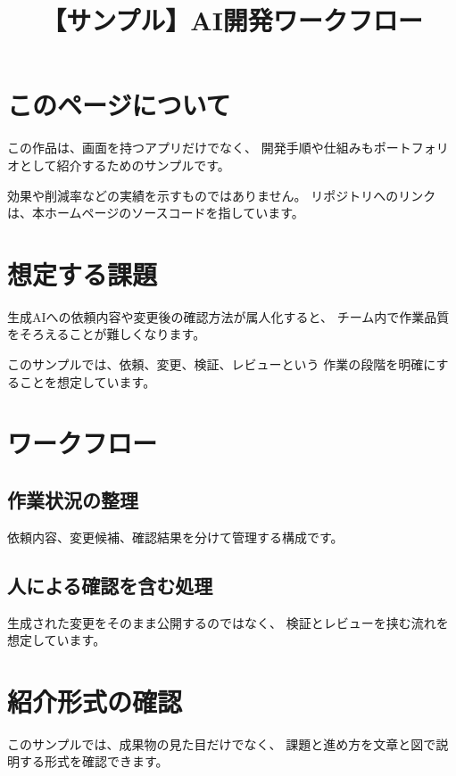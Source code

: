 \title{【サンプル】AI開発ワークフロー}


\begin{portfolio}

\section{このページについて}

この作品は、画面を持つアプリだけでなく、
開発手順や仕組みもポートフォリオとして紹介するためのサンプルです。

効果や削減率などの実績を示すものではありません。
リポジトリへのリンクは、本ホームページのソースコードを指しています。

\section{想定する課題}

生成AIへの依頼内容や変更後の確認方法が属人化すると、
チーム内で作業品質をそろえることが難しくなります。

このサンプルでは、依頼、変更、検証、レビューという
作業の段階を明確にすることを想定しています。

\section{ワークフロー}

\subsection{作業状況の整理}

依頼内容、変更候補、確認結果を分けて管理する構成です。


\subsection{人による確認を含む処理}

生成された変更をそのまま公開するのではなく、
検証とレビューを挟む流れを想定しています。


\section{紹介形式の確認}

このサンプルでは、成果物の見た目だけでなく、
課題と進め方を文章と図で説明する形式を確認できます。

\end{portfolio}
